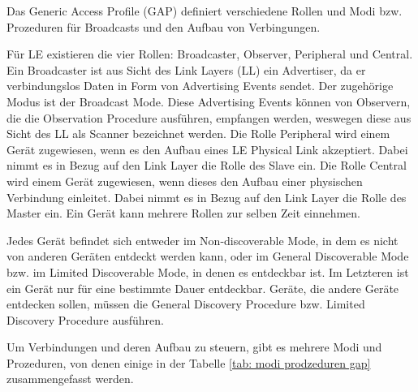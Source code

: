 Das Generic Access Profile (GAP) definiert verschiedene Rollen und Modi bzw. Prozeduren für Broadcasts und den Aufbau von Verbingungen.

Für LE existieren die vier Rollen: Broadcaster, Observer, Peripheral und Central. Ein Broadcaster ist aus Sicht des Link Layers (LL) ein Advertiser, da er verbindungslos Daten in Form von Advertising Events sendet. Der zugehörige Modus ist der Broadcast Mode. Diese Advertising Events können von Observern, die die Observation Procedure ausführen, empfangen werden, weswegen diese aus Sicht des LL als Scanner bezeichnet werden. Die Rolle Peripheral wird einem Gerät zugewiesen, wenn es den Aufbau eines LE Physical Link akzeptiert. Dabei nimmt es in Bezug auf den Link Layer die Rolle des Slave ein. Die Rolle Central wird einem Gerät zugewiesen, wenn dieses den Aufbau einer physischen Verbindung einleitet. Dabei nimmt es in Bezug auf den Link Layer die Rolle des Master ein. Ein Gerät kann mehrere Rollen zur selben Zeit einnehmen. \cite{BtSpec4.0_1638-1639} \cite{BtSpec4.0_1695-1697}

Jedes Gerät befindet sich entweder im Non-discoverable Mode, in dem es nicht von anderen Geräten entdeckt werden kann, oder im General Discoverable Mode bzw. im Limited Discoverable Mode, in denen es entdeckbar ist. Im Letzteren ist ein Gerät nur für eine bestimmte Dauer entdeckbar. Geräte, die andere Geräte entdecken sollen, müssen die General Discovery Procedure bzw. Limited Discovery Procedure ausführen. \cite{BtSpec4.0_1697}

Um Verbindungen und deren Aufbau zu steuern, gibt es mehrere Modi und Prozeduren, von denen einige in der Tabelle \ref{tab: modi prodzeduren gap} zusammengefasst werden.

